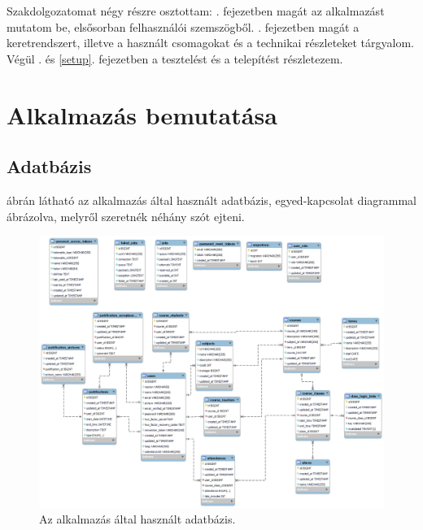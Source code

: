 \documentclass[
]{thesis-ekf}
\theoremstyle{definition}
\theoremstyle{remark}
\begin{document}
Szakdolgozatomat négy részre osztottam: . fejezetben magát az alkalmazást mutatom be, elsősorban felhasználói szemszögből. . fejezetben magát a keretrendszert, illetve a használt csomagokat és a technikai részleteket tárgyalom. Végül . és \ref{setup}. fejezetben a tesztelést és a telepítést részletezem.

\chapter{Alkalmazás bemutatása}
\label{appDescription}
\section{Adatbázis}

 ábrán látható az alkalmazás által használt adatbázis, egyed-kapcsolat diagrammal ábrázolva, melyről szeretnék néhány szót ejteni.

\begin{figure}[ht!]
	\centering
	\includegraphics[width=15cm]{../pictures/db.png}
	\caption{Az alkalmazás által használt adatbázis.}
	\label{database}
\end{figure}
\end{document}
